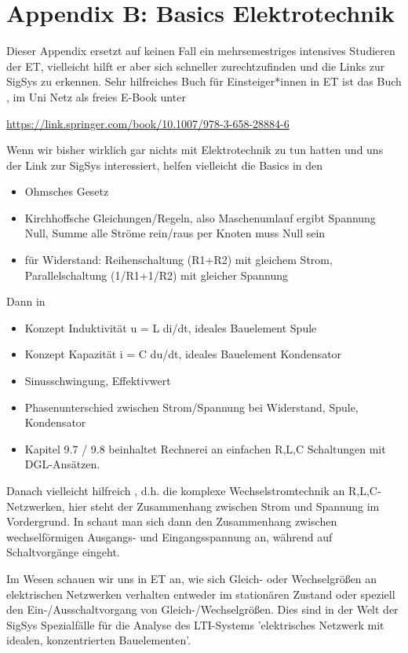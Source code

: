 \clearpage
\section{Appendix B: Basics Elektrotechnik}
%
Dieser Appendix ersetzt auf keinen Fall ein mehrsemestriges intensives Studieren
der ET, vielleicht hilft er aber sich schneller zurechtzufinden und die Links
zur SigSys zu erkennen.
%
Sehr hilfreiches Buch für Einsteiger*innen in ET ist das Buch
\cite{Marinescu2020}, im Uni Netz als freies E-Book unter

\url{https://link.springer.com/book/10.1007/978-3-658-28884-6}

Wenn wir bisher wirklich gar nichts mit Elektrotechnik zu tun hatten und uns
der Link zur SigSys interessiert, helfen vielleicht die Basics
in den \cite[Kapiteln 1-3]{Marinescu2020}
\begin{itemize}
  \item Ohmsches Gesetz
  \item Kirchhoffsche Gleichungen/Regeln, also Maschenumlauf ergibt Spannung Null,
  Summe alle Ströme rein/raus per Knoten muss Null sein
  \item für Widerstand: Reihenschaltung (R1+R2) mit gleichem Strom,
  Parallelschaltung (1/R1+1/R2) mit gleicher Spannung
\end{itemize}
Dann in \cite[Kapitel 9]{Marinescu2020}
\begin{itemize}
\item Konzept Induktivität u = L di/dt, ideales Bauelement Spule
\item Konzept Kapazität i = C du/dt, ideales Bauelement Kondensator
\item Sinusschwingung, Effektivwert
\item Phasenunterschied zwischen Strom/Spannung bei Widerstand, Spule, Kondensator
\item Kapitel 9.7 / 9.8 beinhaltet Rechnerei an
einfachen R,L,C Schaltungen mit DGL-Ansätzen.
\end{itemize}
Danach vielleicht hilfreich \cite[Kap. 10.2 und 10.3]{Marinescu2020}, d.h.
die komplexe Wechselstromtechnik an R,L,C-Netzwerken, hier steht
der Zusammenhang zwischen Strom und Spannung im Vordergrund.
In \cite[Kap. 13]{Marinescu2020} schaut man sich dann den Zusammenhang zwischen
wechselförmigen Ausgangs- und Eingangsspannung an, während
\cite[Kap. 15]{Marinescu2020} auf Schaltvorgänge eingeht.

Im Wesen schauen wir uns in ET an, wie sich Gleich- oder Wechselgrößen
an elektrischen Netzwerken verhalten entweder im stationären Zustand
oder speziell den Ein-/Ausschaltvorgang von Gleich-/Wechselgrößen.
%
Dies sind in der Welt der SigSys Spezialfälle für die Analyse des LTI-Systems
'elektrisches Netzwerk mit idealen, konzentrierten Bauelementen'.

